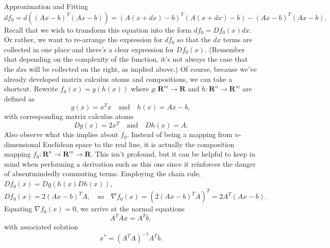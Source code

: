 \begin{chapter}{Approximation and Fitting}
    \[df_0 = d \left( \left(Ax-b\right)^T\left(Ax-b\right) \right) = \left(A(x+dx)-b\right)^T\left(A(x+dx)-b\right) - \left(Ax-b\right)^T\left(Ax-b\right). \]
    Recall that we wish to transform this equation into the form $df_0 = Df_0(x)dx$. Or rather,
    we want to re-arrange the expression for $df_0$ so that the $dx$ terms are collected in one place and there's a clear expression for $Df_0(x)$. 
    (Remember that depending on the complexity of the function, it's not always the case that the $dx$s will be collected on the right, as implied above.)
    Of course, because we've already developed matrix calculus
    atoms and compositions, we can take a shortcut. Rewrite $f_0(x) = g(h(x))$ where $g: \mathbf{R}^m \to \mathbf{R}$ and $h: \mathbf{R}^n \to \mathbf{R}^m$ are defined as
    \[g(x) = x^T x \quad \text{and} \quad h(x) = Ax - b,\]
    with corresponding matrix calculus atoms
    \[Dg(x) = 2x^T \quad \text{and} \quad Dh(x) = A.\]
    Also observe what this implies about $f_0$. Instead of being a mapping from $n$-dimensional Euclidean
    space to the real line, it is actually the composition mapping $f_0: \mathbf{R}^n \to \mathbf{R}^m \to \mathbf{R}$.
    This isn't profound, but it can be helpful to keep in mind when performing a derivation such as this one
    since it reinforces the danger of absentmindedly commuting terms. Employing the chain rule, $Df_0(x) = Dg(h(x)Dh(x))$,
    \[Df_0(x) = 2(Ax - b)^T A, \quad \text{so} \quad \nabla f_0(x) = \left(2(Ax - b)^T A \right)^T = 2A^T(Ax-b).\]
    Equating $\nabla f_0(x) = 0$, we arrive at the normal equations 
    \[A^TAx = A^Tb,\]
    with associated solution
    \[x^* = (A^TA)^{-1} A^T b.\]


\end{chapter}
